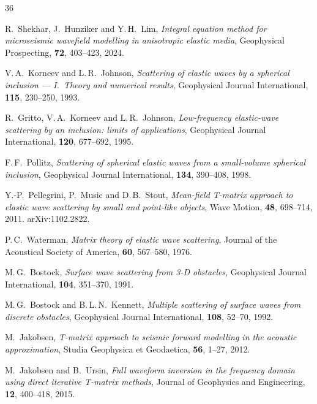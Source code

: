 
\begin{thebibliography}{36}

R.~Shekhar, J.~Hunziker and Y.\,H.~Lim,
\textit{Integral equation method for microseismic wavefield modelling in
anisotropic elastic media},
Geophysical Prospecting, \textbf{72}, 403--423, 2024.

V.\,A.~Korneev and L.\,R.~Johnson,
\textit{Scattering of elastic waves by a spherical inclusion --- I.\ Theory
and numerical results},
Geophysical Journal International, \textbf{115}, 230--250, 1993.

R.~Gritto, V.\,A.~Korneev and L.\,R.~Johnson,
\textit{Low-frequency elastic-wave scattering by an inclusion: limits of
applications},
Geophysical Journal International, \textbf{120}, 677--692, 1995.

F.\,F.~Pollitz,
\textit{Scattering of spherical elastic waves from a small-volume spherical
inclusion},
Geophysical Journal International, \textbf{134}, 390--408, 1998.

Y.-P.~Pellegrini, P.~Music and D.\,B.~Stout,
\textit{Mean-field T-matrix approach to elastic wave scattering by small and
point-like objects},
Wave Motion, \textbf{48}, 698--714, 2011. arXiv:1102.2822.

P.\,C.~Waterman,
\textit{Matrix theory of elastic wave scattering},
Journal of the Acoustical Society of America, \textbf{60}, 567--580, 1976.

M.\,G.~Bostock,
\textit{Surface wave scattering from 3-D obstacles},
Geophysical Journal International, \textbf{104}, 351--370, 1991.

M.\,G.~Bostock and B.\,L.\,N.~Kennett,
\textit{Multiple scattering of surface waves from discrete obstacles},
Geophysical Journal International, \textbf{108}, 52--70, 1992.

M.~Jakobsen,
\textit{T-matrix approach to seismic forward modelling in the acoustic
approximation},
Studia Geophysica et Geodaetica, \textbf{56}, 1--27, 2012.

M.~Jakobsen and B.~Ursin,
\textit{Full waveform inversion in the frequency domain using direct iterative
T-matrix methods},
Journal of Geophysics and Engineering, \textbf{12}, 400--418, 2015.


\end{thebibliography}
